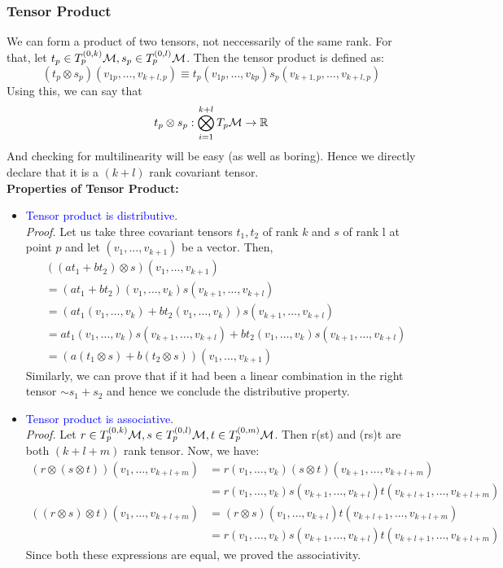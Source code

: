 \subsubsection{Tensor Product}
We can form a product of two tensors, not neccessarily of the same rank. For that, let $t_p\in T_p^{(0,k)}\mathcal M, s_p\in T_p^{(0,l)}\mathcal M$. Then the tensor product is defined as:
$$(t_p\otimes s_p)(v_{1p},\ldots, v_{k+l,p})\equiv t_p(v_{1p},\ldots,v_{kp})s_p(v_{k+1,p},\ldots,v_{k+l,p})$$ 
Using this, we can say that \[t_p\otimes s_p: \bigotimes_{i=1}^{k+l}T_p\mathcal M\rightarrow \mathbb{R}\] And checking for multilinearity will be easy (as well as boring). Hence we directly declare that it is a $(k+l)$ rank covariant tensor. \\[0.2cm]
\textbf{Properties of Tensor Product:} 
\begin{itemize}
    \item \textcolor{blue}{Tensor product is distributive}.\\[0.2cm]
    \textit{Proof.} Let us take three covariant tensors $t_1, t_2$ of rank $k$ and $s$ of rank l at point $p$ and let $(v_1,\ldots,v_{k+1})$ be a vector. Then,
    \begin{align*}
        &((at_1+bt_2)\otimes s) (v_1,\ldots,v_{k+1})\\
        &=(at_1+bt_2)(v_1,\ldots,v_k)s(v_{k+1},\ldots,v_{k+l})\\
        &=(at_1(v_1,\ldots,v_k)+bt_2(v_1,\ldots,v_k))s(v_{k+1},\ldots,v_{k+l})\\
        &=at_1(v_1,\ldots,v_k)s(v_{k+1},\ldots,v_{k+l})+bt_2(v_1,\ldots,v_k)s(v_{k+1},\ldots,v_{k+l})\\
        &=(a(t_1\otimes s) + b(t_2\otimes s))(v_1,\ldots,v_{k+1})
    \end{align*}
    Similarly, we can prove that if it had been a linear combination in the right tensor $\sim s_1+s_2$ and hence we conclude the distributive property.
    \item \textcolor{blue}{Tensor product is associative}.\\[0.2cm]
    \textit{Proof.} Let $r\in T^{(0,k)}_p\mathcal M,s\in T^{(0,l)}_p\mathcal M,t\in T^{(0,m)}_p\mathcal M$. Then r\otimes (s\otimes t) and (r\otimes s)\otimes t are both $(k+l+m)$ rank tensor. Now, we have:
    \begin{align*}
        (r\otimes(s\otimes t))(v_1, \ldots, v_{k+l+m}) &= r(v_1,\ldots,v_k) (s\otimes t)(v_{k+1},\ldots,v_{k+l+m})\\
        &=r(v_1,\ldots,v_k) s(v_{k+1},\ldots,v_{k+l})t(v_{k+l+1},\ldots,v_{k+l+m})\\[0.2cm]
        ((r\otimes s)\otimes t)(v_1, \ldots, v_{k+l+m}) &= (r\otimes s)(v_1,\ldots,v_{k+l}) t(v_{k+l+1},\ldots,v_{k+l+m})\\
        &=r(v_1,\ldots,v_k) s(v_{k+1},\ldots,v_{k+l})t(v_{k+l+1},\ldots,v_{k+l+m})
    \end{align*}
    Since both these expressions are equal, we proved the associativity.
\end{itemize}

